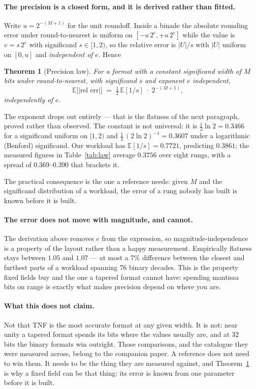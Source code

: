\documentclass[11pt]{article}
\newtheorem{theorem}{Theorem}
\theoremstyle{definition}
\begin{document}
\paragraph{The precision is a closed form, and it is derived rather than fitted.}
Write $u = 2^{-(M+1)}$ for the unit roundoff. Inside a binade the absolute
rounding error under round-to-nearest is uniform on $[-u\,2^{e}, +u\,2^{e}]$
while the value is $v = s\,2^{e}$ with significand $s \in [1,2)$, so the relative
error is $|U|/s$ with $|U|$ uniform on $[0,u]$ and \emph{independent of $e$}.
Hence
\begin{theorem}[Precision law]\label{thm:law}
For a format with a constant significand width of $M$ bits under
round-to-nearest, with significand $s$ and exponent $e$ independent,
\[
  \mathbb{E}\bigl[|\text{rel err}|\bigr] \;=\; \tfrac{1}{2}\,\mathbb{E}[1/s]\;\cdot\;2^{-(M+1)} ,
\]
independently of $e$.
\end{theorem}
The exponent drops out entirely --- that is the flatness of the next paragraph,
proved rather than observed. The constant is not universal: it is
$\tfrac{1}{2}\ln 2 = 0.3466$ for a significand uniform on $[1,2)$ and
$\tfrac{1}{2}\,(2\ln 2)^{-1} = 0.3607$ under a logarithmic (Benford) significand.
Our workload has $\mathbb{E}[1/s] = 0.7721$, predicting $0.3861$; the measured
figures in Table~\ref{tab:law} average $0.3756$ over eight rungs, with a spread
of $0.369$--$0.390$ that brackets it.

The practical consequence is the one a reference needs: given $M$ and the
significand distribution of a workload, the error of a rung nobody has built is
known before it is built.

\paragraph{The error does not move with magnitude, and cannot.} The derivation
above removes $e$ from the expression, so magnitude-independence is a property of
the layout rather than a happy measurement. Empirically flatness stays between
$1.05$ and $1.07$ --- at most a $7\%$ difference between the closest and furthest
parts of a workload spanning 76 binary decades. This is the property fixed fields
buy and the one a tapered format cannot have: spending mantissa bits on range is
exactly what makes precision depend on where you are.

\paragraph{What this does not claim.} Not that TNF is the most accurate format
at any given width. It is not: near unity a tapered format spends its bits where
the values usually are, and at $32$ bits the binary formats win outright. Those
comparisons, and the catalogue they were measured across, belong to the
companion paper. A reference does not need to win them. It needs to be the thing
they are measured against, and Theorem~\ref{thm:law} is why a fixed field can be
that thing: its error is known from one parameter before it is built.
\end{document}
